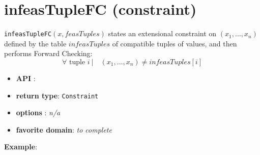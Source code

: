 \label{infeastuplefc}
\hypertarget{infeastuplefc}{}

\section{infeasTupleFC (constraint)}\label{infeastuplefc:infeastuplefcconstraint}\hypertarget{infeastuplefc:infeastuplefcconstraint}{}
\begin{notedef}
  \texttt{infeasTupleFC}$(x,feasTuples)$ states an extensional constraint on $(x_1,\ldots,x_n)$ defined by the table $infeasTuples$ of compatible tuples of values, and then performs Forward Checking:
      $$\forall \text{ tuple } i\ |\quad (x_1,\ldots,x_n)\neq infeasTuples[i]$$
\end{notedef}

\begin{itemize}
	\item \textbf{API} : 
	\item \textbf{return type}: \texttt{Constraint}
	\item \textbf{options} : \emph{n/a}
	\item \textbf{favorite domain}: \emph{to complete}
\end{itemize}

\textbf{Example}:

